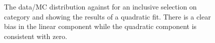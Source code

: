 \begin{figure}[h!]
  \centering
  ~~
  \\
  ~~
  \\
  \caption{\label{fig:linearMotiv} 
  The data/MC distribution against \mht for an inclusive selection on category and \ht
  showing the results of a quadratic fit. There is a clear bias
  in the linear component while the quadratic component is consistent with zero.
}
\end{figure}

